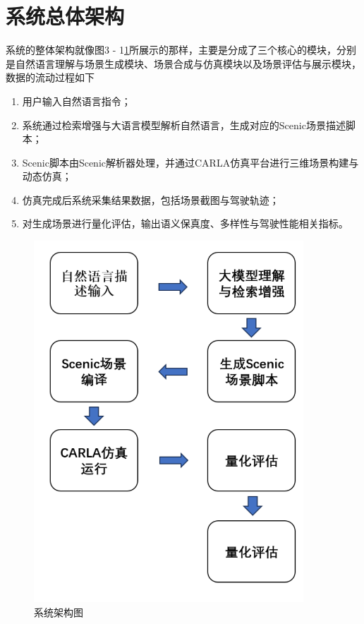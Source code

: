 \section{系统总体架构}
系统的整体架构就像图3 - 1\ref{fig:system_architecture}所展示的那样，主要是分成了三个核心的模块，分别是自然语言理解与场景生成模块、场景合成与仿真模块以及场景评估与展示模块，数据的流动过程如下
\begin{enumerate}
	\item 用户输入自然语言指令；
	\item 系统通过检索增强与大语言模型解析自然语言，生成对应的Scenic场景描述脚本；
	\item Scenic脚本由Scenic解析器处理，并通过CARLA仿真平台进行三维场景构建与动态仿真；
	\item 仿真完成后系统采集结果数据，包括场景截图与驾驶轨迹；
	\item 对生成场景进行量化评估，输出语义保真度、多样性与驾驶性能相关指标。
\end{enumerate}
\begin{figure}[H]
	\centering
	\includegraphics[width=0.9\textwidth]{../images/系统架构图.pdf} 
	\caption{系统架构图}
	\label{fig:system_architecture} %
\end{figure}

